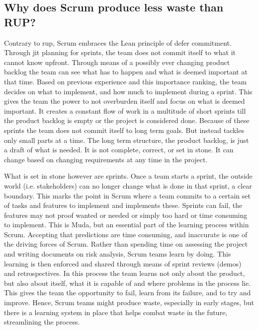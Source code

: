 \subsection{Why does Scrum produce less waste than RUP?} 
Contrary to \ac{rup}, Scrum embraces the Lean principle of defer commitment. Through \ac{jit} planning for sprints, the team does not commit itself to what it cannot know upfront. 
Through means of a possibly ever changing product backlog the team can see what has to happen and what is deemed important at that time. 
Based on previous experience and this importance ranking, the team decides on what to implement, and how much to implement during a sprint. 
This gives the team the power to not overburden itself and focus on what is deemed important. 
It creates a constant flow of work in a multitude of short sprints till the product backlog is empty or the project is considered done. 
Because of these sprints the team does not commit itself to long term goals. 
But instead tackles only small parts at a time. 
The long term structure, the product backlog, is just a draft of what is needed. 
It is not complete, correct, or set in stone. It can change based on changing requirements at any time in the project. 

What is set in stone however are sprints. Once a team starts a sprint, the outside world (i.e. stakeholders) can no longer change what is done in that sprint, a clear boundary. 
This marks the point in Scrum where a team commits to a certain set of tasks and features to implement and implements these. 
Sprints can fail, the features may not proof wanted or needed or simply too hard or time consuming to implement. 
This is Muda, but an essential part of the learning process within Scrum. 
Accepting that predictions are time consuming, and inaccurate is one of the driving forces of Scrum. 
Rather than spending time on assessing the project and writing documents on risk analysis, Scrum teams learn by doing. 
This learning is then enforced and shared through means of sprint reviews (demos) and retrospectives. 
In this process the team learns not only about the product, but also about itself, what it is capable of and where problems in the process lie. 
This gives the team the opportunity to fail, learn from its failure, and to try and improve. 
Hence, Scrum teams might produce waste, especially in early stages, but there is a learning system in place that helps combat waste in the future, streamlining the process.


